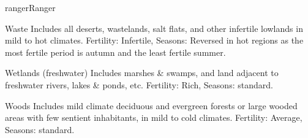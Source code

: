 \begin{Skill}[2.1]{ranger}{Ranger}
\begin{Description}
\item[Waste] Includes all deserts, wastelands, salt flats, and other
  infertile lowlands in mild to hot climates.  Fertility: Infertile,
  Seasons: Reversed in hot regions as the most fertile period is
  autumn and the least fertile summer.

\item[Wetlands (freshwater)] Includes marshes \& swamps, and land
  adjacent to freshwater rivers, lakes \& ponds, etc.  Fertility:
  Rich, Seasons: standard.

\item[Woods] Includes mild climate deciduous and evergreen forests or
  large wooded areas with few sentient inhabitants, in mild to cold
  climates. Fertility: Average, Seasons: standard.

\end{Description}
\end{Skill}

